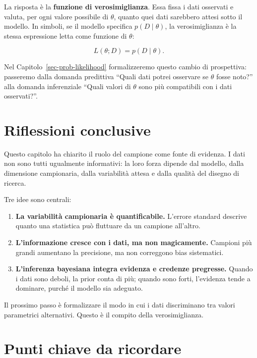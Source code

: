 \documentclass[
  italian,
  letterpaper,
  a4paper,
  11pt,
  open=any]{scrbook}
\providecommand{\tightlist}{%
  \setlength{\itemsep}{0pt}\setlength{\parskip}{0pt}}
\theoremstyle{plain}
\theoremstyle{definition}
\theoremstyle{definition}
\theoremstyle{remark}
\begin{document}
La risposta è la \textbf{funzione di verosimiglianza}. Essa fissa i dati
osservati e valuta, per ogni valore possibile di \(\theta\), quanto quei
dati sarebbero attesi sotto il modello. In simboli, se il modello
specifica \(p(D \mid \theta)\), la verosimiglianza è la stessa
espressione letta come funzione di \(\theta\):

\[
L(\theta; D) = p(D \mid \theta).
\]

Nel Capitolo~\ref{sec-prob-likelihood} formalizzeremo questo cambio di
prospettiva: passeremo dalla domanda predittiva ``Quali dati potrei
osservare se \(\theta\) fosse noto?'' alla domanda inferenziale ``Quali
valori di \(\theta\) sono più compatibili con i dati osservati?''.

\section*{Riflessioni conclusive}\label{riflessioni-conclusive-12}


Questo capitolo ha chiarito il ruolo del campione come fonte di
evidenza. I dati non sono tutti ugualmente informativi: la loro forza
dipende dal modello, dalla dimensione campionaria, dalla variabilità
attesa e dalla qualità del disegno di ricerca.

Tre idee sono centrali:

\begin{enumerate}
\def\labelenumi{\arabic{enumi}.}
\tightlist
\item
  \textbf{La variabilità campionaria è quantificabile.} L'errore
  standard descrive quanto una statistica può fluttuare da un campione
  all'altro.
\item
  \textbf{L'informazione cresce con i dati, ma non magicamente.}
  Campioni più grandi aumentano la precisione, ma non correggono bias
  sistematici.
\item
  \textbf{L'inferenza bayesiana integra evidenza e credenze pregresse.}
  Quando i dati sono deboli, la prior conta di più; quando sono forti,
  l'evidenza tende a dominare, purché il modello sia adeguato.
\end{enumerate}

Il prossimo passo è formalizzare il modo in cui i dati discriminano tra
valori parametrici alternativi. Questo è il compito della
verosimiglianza.

\section*{Punti chiave da ricordare}\label{punti-chiave-da-ricordare-12}
\end{document}
